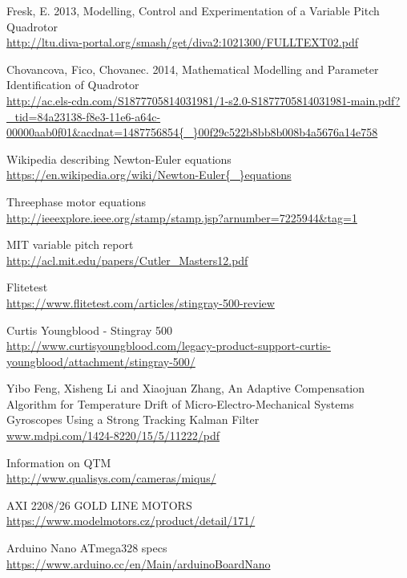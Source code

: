 \begin{thebibliography}{9}
        Fresk, E. 2013, Modelling, Control and Experimentation of a Variable Pitch Quadrotor \\ 
\url{http://ltu.diva-portal.org/smash/get/diva2:1021300/FULLTEXT02.pdf}

        Chovancova, Fico, Chovanec. 2014, Mathematical Modelling and Parameter Identification of Quadrotor \\ 
\url{http://ac.els-cdn.com/S1877705814031981/1-s2.0-S1877705814031981-main.pdf?_tid=84a23138-f8e3-11e6-a64c-00000aab0f01&acdnat=1487756854{\_}00f29c522b8bb8b008b4a5676a14e758}

        Wikipedia describing Newton-Euler equations \\ 
\url{https://en.wikipedia.org/wiki/Newton-Euler{\_}equations}

    Threephase motor equations \\
\url{http://ieeexplore.ieee.org/stamp/stamp.jsp?arnumber=7225944&tag=1}

    MIT variable pitch report \\
\url{http://acl.mit.edu/papers/Cutler_Masters12.pdf}

 Flitetest \\
    \url{https://www.flitetest.com/articles/stingray-500-review}
    
 Curtis Youngblood - Stingray 500 \\
    \url{http://www.curtisyoungblood.com/legacy-product-support-curtis-youngblood/attachment/stingray-500/}
    
Yibo Feng, Xisheng Li and Xiaojuan Zhang, An Adaptive Compensation Algorithm for Temperature Drift of Micro-Electro-Mechanical Systems Gyroscopes Using a Strong Tracking Kalman Filter \\
\url{www.mdpi.com/1424-8220/15/5/11222/pdf}

             Information on QTM \\ 
\url{http://www.qualisys.com/cameras/miqus/}

             AXI 2208/26 GOLD LINE MOTORS \\ 
\url{https://www.modelmotors.cz/product/detail/171/}

             Arduino Nano ATmega328 specs \\ 
\url{https://www.arduino.cc/en/Main/arduinoBoardNano}



\end{thebibliography}
